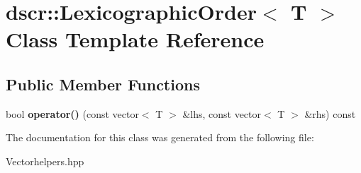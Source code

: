\hypertarget{classdscr_1_1_lexicographic_order}{\section{dscr\-:\-:Lexicographic\-Order$<$ T $>$ Class Template Reference}
\label{classdscr_1_1_lexicographic_order}
}
\subsection*{Public Member Functions}
\begin{DoxyCompactItemize}
\item 
\hypertarget{classdscr_1_1_lexicographic_order_aae9a09f986ee554fd5322cc83a500dd3}{bool {\bfseries operator()} (const vector$<$ T $>$ \&lhs, const vector$<$ T $>$ \&rhs) const }\label{classdscr_1_1_lexicographic_order_aae9a09f986ee554fd5322cc83a500dd3}

\end{DoxyCompactItemize}


The documentation for this class was generated from the following file\-:\begin{DoxyCompactItemize}
\item 
Vectorhelpers.\-hpp\end{DoxyCompactItemize}

